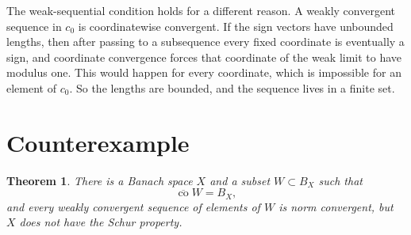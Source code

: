 \documentclass[11pt]{article}
\newtheorem{theorem}{Theorem}
\newcommand{\co}{\operatorname{co}}
\begin{document}
The weak-sequential condition holds for a different reason.  A weakly
convergent sequence in \(c_0\) is coordinatewise convergent.  If the sign
vectors have unbounded lengths, then after passing to a subsequence every
fixed coordinate is eventually a sign, and coordinate convergence forces
that coordinate of the weak limit to have modulus one.  This would happen
for every coordinate, which is impossible for an element of \(c_0\).  So
the lengths are bounded, and the sequence lives in a finite set.

\section*{Counterexample}

\begin{theorem}
There is a Banach space \(X\) and a subset \(W\subset B_X\) such that
\[
  \overline{\co} W=B_X,
\]
and every weakly convergent sequence of elements of \(W\) is norm
convergent, but \(X\) does not have the Schur property.
\end{theorem}
\end{document}
